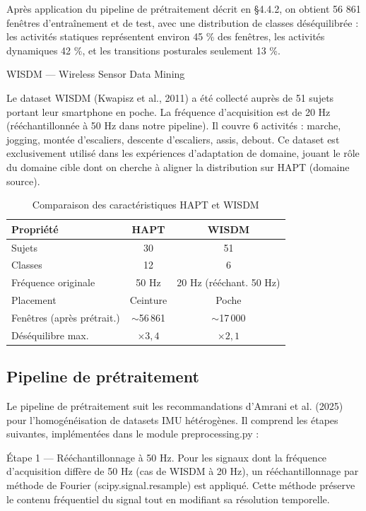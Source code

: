 \documentclass[a4paper,12pt]{report}
\begin{document}
Après application du pipeline de prétraitement décrit en §4.4.2, on obtient 56 861 fenêtres d'entraînement et de test, avec une distribution de classes déséquilibrée : les activités statiques représentent environ 45 \% des fenêtres, les activités dynamiques 42 \%, et les transitions posturales seulement 13 \%.

WISDM — Wireless Sensor Data Mining

Le dataset WISDM (Kwapisz et al., 2011) a été collecté auprès de 51 sujets portant leur smartphone en poche. La fréquence d'acquisition est de 20 Hz (rééchantillonnée à 50 Hz dans notre pipeline). Il couvre 6 activités : marche, jogging, montée d'escaliers, descente d'escaliers, assis, debout. Ce dataset est exclusivement utilisé dans les expériences d'adaptation de domaine, jouant le rôle du domaine cible dont on cherche à aligner la distribution sur HAPT (domaine source).

\begin{table}[H]
\centering
\small
\begin{tabularx}{0.92\textwidth}{|Y|c|c|}
\hline
\textbf{Propriété} & \textbf{HAPT} & \textbf{WISDM} \\
\hline
Sujets                    & 30  & 51 \\
Classes                   & 12  & 6 \\
Fréquence originale       & 50 Hz & 20 Hz (rééchant. 50 Hz) \\
Placement                 & Ceinture & Poche \\
Fenêtres (après prétrait.) & $\sim$56\,861 & $\sim$17\,000 \\
Déséquilibre max.         & $\times 3{,}4$ & $\times 2{,}1$ \\
\hline
\end{tabularx}
\caption{Comparaison des caractéristiques HAPT et WISDM}
\label{tab:hapt_wisdm}
\end{table}

\subsection{Pipeline de prétraitement}

Le pipeline de prétraitement suit les recommandations d'Amrani et al. (2025) pour l'homogénéisation de datasets IMU hétérogènes. Il comprend les étapes suivantes, implémentées dans le module preprocessing.py :

Étape 1 — Rééchantillonnage à 50 Hz. Pour les signaux dont la fréquence d'acquisition diffère de 50 Hz (cas de WISDM à 20 Hz), un rééchantillonnage par méthode de Fourier (scipy.signal.resample) est appliqué. Cette méthode préserve le contenu fréquentiel du signal tout en modifiant sa résolution temporelle.
\end{document}
